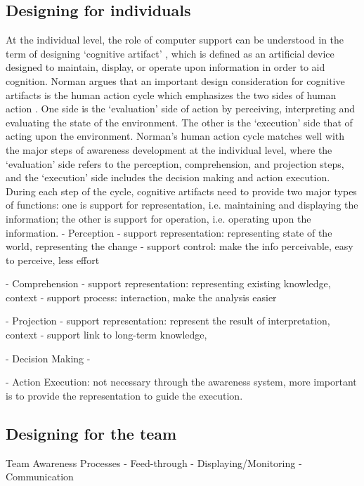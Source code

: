 \subsection{Designing for individuals} %
\label{sub:designing_for_individuals}
At the individual level, the role of computer support can be understood in the term of designing `cognitive artifact' \cite{Norman1992}, which is defined as an artificial device designed to maintain, display, or operate upon information in order to aid cognition. Norman argues that an important design consideration for cognitive artifacts is the human action cycle which emphasizes the two sides of human action \cite{Norman1992}. One side is the `evaluation' side of action by perceiving, interpreting and evaluating the state of the environment. The other is the `execution' side that of acting upon the environment. Norman's human action cycle matches well with the major steps of awareness development at the individual level, where the `evaluation' side refers to the perception, comprehension, and projection steps, and the `execution' side includes the decision making and action execution. During each step of the cycle, cognitive artifacts need to provide two major types of functions: one is support for representation, i.e. maintaining and displaying the information; the other is support for operation, i.e. operating upon the information.
 - Perception
  - support representation: representing state of the world, representing the change
  - support control: make the info perceivable, easy to perceive, less effort

 - Comprehension
  - support representation: representing existing knowledge, context
  - support process: interaction, make the analysis easier 	

 - Projection
  - support representation: represent the result of interpretation, context
  - support link to long-term knowledge, 

 - Decision Making
  - 

 - Action Execution: not necessary through the awareness system, more important is to provide the representation to guide the execution.

\subsection{Designing for the team} %
\label{sub:designing_for_the_team}
Team Awareness Processes
 - Feed-through
 - Displaying/Monitoring
 - Communication

